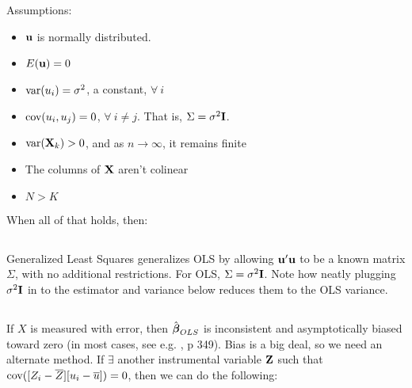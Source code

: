 Assumptions:

\begin{itemize}
\item ${\bf u}$ is normally distributed.
\item $E({\bf u}) = 0$
\item $\hbox{var}(u_i) = \sigma^2$, a constant, $\forall\ i$
\item $\hbox{cov}(u_i, u_j) = 0$, $\forall\ i\neq j$. That is, $\Sigma =
\sigma^2{\bf I}$.
\item $\hbox{var}({\bf X}_k)>0$, and as $n\to\infty$, it remains finite
\item The columns of ${\bf X}$ aren't colinear
\item $N>K$
\end{itemize}

When all of that holds, then:

\subsection{}					\label{GLS}
Generalized Least Squares generalizes OLS by allowing ${\bf u}'{\bf u}$ to be a
known matrix $\Sigma$, with no additional restrictions. For OLS,
$\Sigma=\sigma^2{\bf I}$. Note how neatly plugging $\sigma^2{\bf I}$ in to the
estimator and variance below reduces them to the OLS variance.


\subsection{}			\label{IV}

If $X$ is measured with error, then $\hat{{\mbox{\boldmath$\beta$}}}_{OLS}$ is inconsistent and
asymptotically biased toward zero (in most cases, see e.g. \cite{kmenta},
p 349). Bias is a big deal, so we need an alternate method. If $\exists$
another instrumental variable ${\bf Z}$ such that $\hbox{cov}([Z_i-\overline
Z][u_i-\overline u])=0$, then we can do the following:

